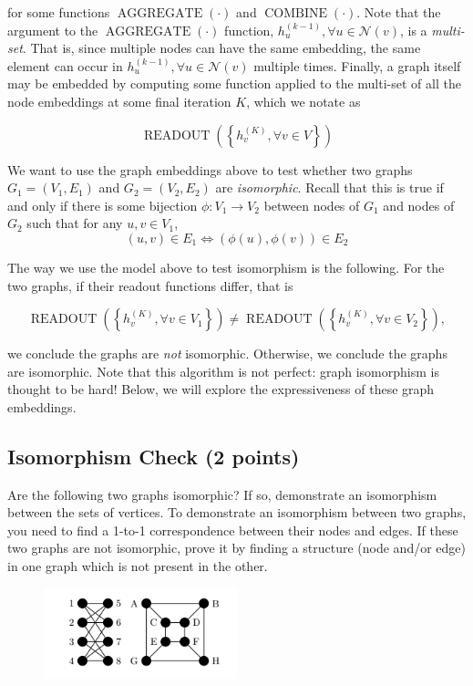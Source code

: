 \documentclass{article}
\numberwithin{figure}{section}
\begin{document}
\noindent for some functions $\operatorname{AGGREGATE}(\cdot)$ and $\operatorname{COMBINE}(\cdot)$. Note that the argument to the $\operatorname{AGGREGATE}(\cdot)$ function, ${h^{(k-1)}_u, \forall u \in \mathcal{N}(v)}$, is a \textit{multi-set}.
That is, since multiple nodes can have the same embedding, the same element can occur in ${h^{(k-1)}_u, \forall u \in \mathcal{N}(v)}$ multiple times.
Finally, a graph itself may be embedded by computing some function applied to the multi-set of all the node embeddings at some final iteration $K$, which we notate as 

$$\operatorname { READOUT }\left(\left\{h_v^{(K)}, \forall v \in V\right\}\right)$$

We want to use the graph embeddings above to test whether two graphs $G_1 = (V_1, E_1)$ and $G_2 = (V_2, E_2)$ are \textit{isomorphic}.
Recall that this is true if and only if there is some bijection $\phi : V_1 \rightarrow V_2$ between nodes of $G_1$ and nodes of $G_2$ such that for any $u, v \in V_1$, 
$$(u, v) \in E_1 \Leftrightarrow (\phi(u), \phi(v)) \in E_2$$

The way we use the model above to test isomorphism is the following. For the two graphs, if their readout functions differ, that is 

$$\operatorname { READOUT }\left(\left\{h_v^{(K)}, \forall v \in V_1\right\}\right) \neq \operatorname { READOUT }\left(\left\{h_v^{(K)}, \forall v \in V_2\right\}\right),$$

we conclude the graphs are \textit{not} isomorphic. Otherwise, we conclude the graphs are isomorphic. Note that this algorithm is not perfect: graph isomorphism is thought to be hard! Below, we will explore the expressiveness of these graph embeddings. 

\subsection{Isomorphism Check (2 points)}
Are the following two graphs isomorphic? If so, demonstrate an isomorphism
between the sets of vertices. To demonstrate an isomorphism between two
graphs, you need to find a 1-to-1 correspondence between their nodes and edges.
If these two graphs are not isomorphic, prove it by finding a structure (node
and/or edge) in one graph which is not present in the other. 
    \begin{figure}[H]
        \centering
        \includegraphics[width=0.5\textwidth]{CS224W_Homework1/fig1.png}
        \label{fig:my_label2}
    \end{figure}
\end{document}
